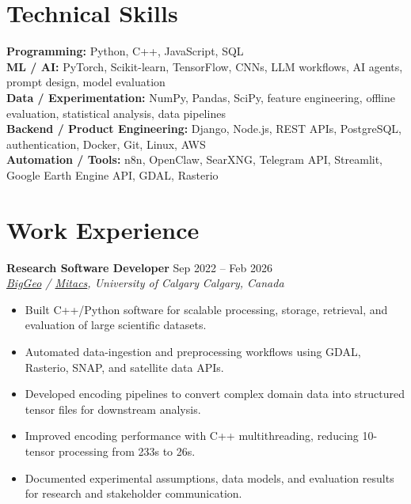 \documentclass[a4paper,10pt]{article}
\newcommand{\resumeSubheading}[4]{
    \textbf{#1} \hfill #2 \\
    \textit{#3} \hfill \textit{#4}
}
\begin{document}
\section*{Technical Skills}

\textbf{Programming:} Python, C++, JavaScript, SQL \\
\textbf{ML / AI:} PyTorch, Scikit-learn, TensorFlow, CNNs, LLM workflows, AI agents, prompt design, model evaluation \\
\textbf{Data / Experimentation:} NumPy, Pandas, SciPy, feature engineering, offline evaluation, statistical analysis, data pipelines \\
\textbf{Backend / Product Engineering:} Django, Node.js, REST APIs, PostgreSQL, authentication, Docker, Git, Linux, AWS \\
\textbf{Automation / Tools:} n8n, OpenClaw, SearXNG, Telegram API, Streamlit, Google Earth Engine API, GDAL, Rasterio


\section*{Work Experience}

\resumeSubheading
{Research Software Developer}
{Sep 2022 -- Feb 2026}
{\href{https://biggeo.com}{BigGeo} / \href{https://www.mitacs.ca/}{Mitacs}, University of Calgary}
{Calgary, Canada}
\begin{itemize}[leftmargin=0.25in]
    \item Built C++/Python software for scalable processing, storage, retrieval, and evaluation of large scientific datasets.
    \item Automated data-ingestion and preprocessing workflows using GDAL, Rasterio, SNAP, and satellite data APIs.
    \item Developed encoding pipelines to convert complex domain data into structured tensor files for downstream analysis.
    \item Improved encoding performance with C++ multithreading, reducing 10-tensor processing from 233s to 26s.
    \item Documented experimental assumptions, data models, and evaluation results for research and stakeholder communication.
\end{itemize}
\end{document}
